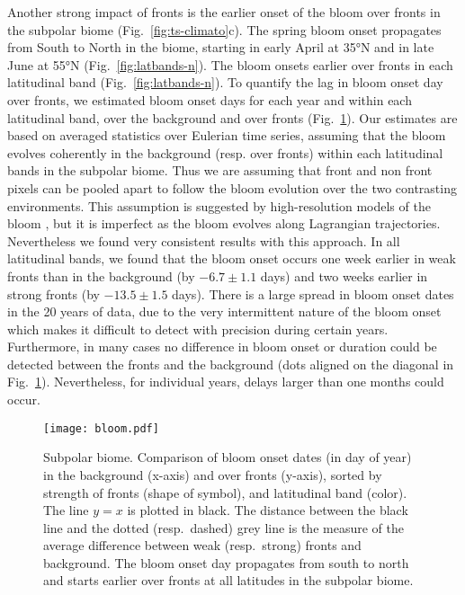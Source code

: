 Another strong impact of fronts is the earlier onset of the bloom over fronts in the subpolar biome (Fig.~\ref{fig:ts-climato}c).
The spring bloom onset propagates from South to North in the biome, starting in early April at 35°N and in late June at 55°N (Fig.~\ref{fig:latbands-n}).
The bloom onsets earlier over fronts in each latitudinal band (Fig.~\ref{fig:latbands-n}).
To quantify the lag in bloom onset day over fronts, we estimated bloom onset days for each year and within each latitudinal band, over the background and over fronts (Fig.~\ref{fig:bloom}).
Our estimates are based on averaged statistics over Eulerian time series, assuming that the bloom evolves coherently in the background (resp.
over fronts) within each latitudinal bands in the subpolar biome.
Thus we are assuming that front and non front pixels can be pooled apart to follow the bloom evolution over the two contrasting environments.
This assumption is suggested by high-resolution models of the bloom \citep[e.g.][]{levy_2005a, karleskind_2011}, but it is imperfect as the bloom evolves along Lagrangian trajectories.
Nevertheless we found very consistent results with this approach.
In all latitudinal bands, we found that the bloom onset occurs one week earlier in weak fronts than in the background (by \( -6.7 \pm 1.1 \) days) and two weeks earlier in strong fronts (by \( -13.5 \pm 1.5 \) days).
There is a large spread in bloom onset dates in the 20 years of data, due to the very intermittent nature of the bloom onset \citep{keerthi_2021} which makes it difficult to detect with precision during certain years.
Furthermore, in many cases no difference in bloom onset or duration could be detected between the fronts and the background (dots aligned on the diagonal in Fig.~\ref{fig:bloom}).
Nevertheless, for individual years, delays larger than one months could occur.

\begin{figure}
  \texttt{[image: bloom.pdf]}
  \caption{
    Subpolar biome. Comparison of bloom onset dates (in day of year) in the background (x-axis) and over fronts (y-axis), sorted by strength of fronts (shape of symbol), and latitudinal band (color).
    The line \(y=x\) is plotted in black.
    The distance between the black line and the dotted (resp.\ dashed) grey line is the measure of the average difference between weak (resp.\ strong) fronts and background.
    The bloom onset day propagates from south to north and starts earlier over fronts at all latitudes in the subpolar biome.
  }%
  \label{fig:bloom}
\end{figure}


